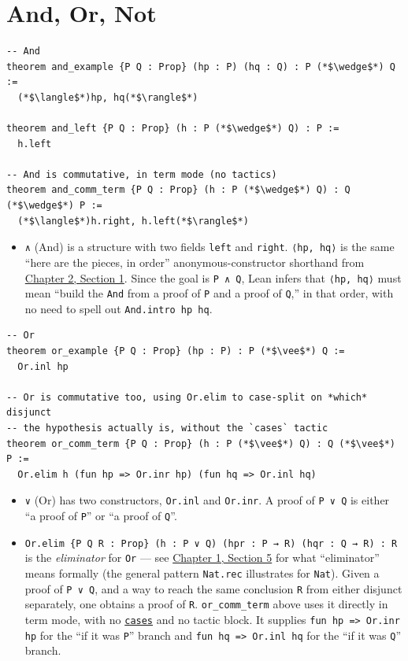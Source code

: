 \section{And, Or, Not}\label{sec:03-propositions-and-proofs:05-and-or-not:1}

\begin{lstlisting}
-- And
theorem and_example {P Q : Prop} (hp : P) (hq : Q) : P (*$\wedge$*) Q :=
  (*$\langle$*)hp, hq(*$\rangle$*)

theorem and_left {P Q : Prop} (h : P (*$\wedge$*) Q) : P :=
  h.left

-- And is commutative, in term mode (no tactics)
theorem and_comm_term {P Q : Prop} (h : P (*$\wedge$*) Q) : Q (*$\wedge$*) P :=
  (*$\langle$*)h.right, h.left(*$\rangle$*)
\end{lstlisting}

\begin{itemize}
\tightlist
\item
  \texttt{∧} (And) is a structure with two fields \texttt{left} and \texttt{right}. \texttt{⟨hp, hq⟩} is the same ``here are the pieces, in order'' anonymous-constructor shorthand from \hyperref[sec:02-functions-and-structures:01-structure-basics:1]{Chapter 2, Section 1}. Since the goal is \texttt{P ∧ Q}, Lean infers that \texttt{⟨hp, hq⟩} must mean ``build the \texttt{And} from a proof of \texttt{P} and a proof of \texttt{Q},'' in that order, with no need to spell out \texttt{And.intro hp hq}.
\end{itemize}

\begin{lstlisting}
-- Or
theorem or_example {P Q : Prop} (hp : P) : P (*$\vee$*) Q :=
  Or.inl hp

-- Or is commutative too, using Or.elim to case-split on *which* disjunct
-- the hypothesis actually is, without the `cases` tactic
theorem or_comm_term {P Q : Prop} (h : P (*$\vee$*) Q) : Q (*$\vee$*) P :=
  Or.elim h (fun hp => Or.inr hp) (fun hq => Or.inl hq)
\end{lstlisting}

\begin{itemize}
\tightlist
\item
  \texttt{∨} (Or) has two constructors, \texttt{Or.inl} and \texttt{Or.inr}. A proof of \texttt{P ∨ Q} is either ``a proof of \texttt{P}'' or ``a proof of \texttt{Q}''.
\item
  \texttt{Or.elim \{P Q R : Prop\} (h : P ∨ Q) (hpr : P → R) (hqr : Q → R) : R} is the \emph{eliminator} for \texttt{Or} --- see \hyperref[sec:01-basics:05-pi-sigma-and-coc:1]{Chapter 1, Section 5} for what ``eliminator'' means formally (the general pattern \texttt{Nat.rec} illustrates for \texttt{Nat}). Given a proof of \texttt{P ∨ Q}, and a way to reach the same conclusion \texttt{R} from either disjunct separately, one obtains a proof of \texttt{R}. \texttt{or\_\allowbreak{}comm\_\allowbreak{}term} above uses it directly in term mode, with no \href{https://lean-lang.org/doc/reference/latest/Tactic-Proofs/Tactic-Reference/}{\texttt{cases}} and no tactic block. It supplies \texttt{fun hp => Or.inr hp} for the ``if it was \texttt{P}'' branch and \texttt{fun hq => Or.inl hq} for the ``if it was \texttt{Q}'' branch.
\end{itemize}


